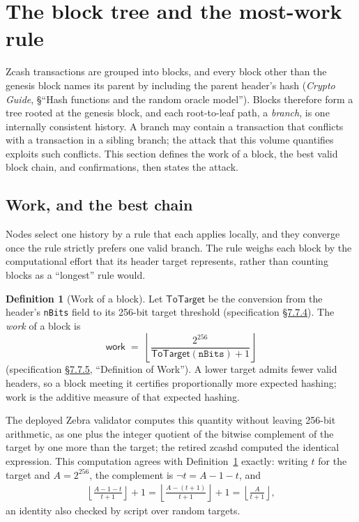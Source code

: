 \documentclass[11pt,a4paper]{article}
\theoremstyle{definition}
\newtheorem{definition}[theorem]{Definition}
\begin{document}
\section{The block tree and the most-work rule}\label{sec:cons-chain}

Zcash transactions are grouped into blocks, and every block other than the
genesis block names its parent by including the parent header's hash
(\emph{Crypto Guide}, \S``Hash functions and the random oracle model'').
Blocks therefore form a tree rooted at the genesis block, and each
root-to-leaf path, a \emph{branch}, is one internally consistent history. A
branch may contain a transaction that conflicts with a transaction in a
sibling branch; the attack that this volume quantifies exploits such
conflicts. This section defines the work of a block, the best valid block
chain, and confirmations, then states the attack.

\subsection{Work, and the best chain}\label{sec:cons-bestchain}

Nodes select one history by a rule that each applies locally, and they
converge once the rule strictly prefers one valid branch. The rule
weighs each block by the computational effort that its header target
represents, rather than counting blocks as a ``longest'' rule would.

\begin{definition}[Work of a block]\label{def:cons-work}
Let $\mathsf{ToTarget}$ be the conversion from the header's
\texttt{nBits} field to its 256-bit target threshold (specification
\href{https://zips.z.cash/protocol/protocol.pdf\#nbits}{\S7.7.4}). The \emph{work} of a block is
\[
  \mathsf{work} \;=\;
  \left\lfloor \frac{2^{256}}{\mathsf{ToTarget}(\texttt{nBits}) + 1}
  \right\rfloor
\]
(specification \href{https://zips.z.cash/protocol/protocol.pdf\#workdef}{\S7.7.5}, ``Definition of Work''). A lower target admits
fewer valid headers, so a block meeting it certifies proportionally more
expected hashing; work is the additive measure of that expected hashing.
\end{definition}

The deployed Zebra validator computes this quantity without leaving 256-bit
arithmetic, as one plus the integer quotient of the bitwise complement of the
target by one more than the target; the retired \textsf{zcashd} computed the
identical expression. This computation agrees with
Definition~\ref{def:cons-work} exactly: writing $t$ for the target and $A =
2^{256}$, the complement is $\lnot t = A - 1 - t$, and
\begin{gather*}
\left\lfloor \frac{A-1-t}{t+1} \right\rfloor + 1
= \left\lfloor \frac{A - (t+1)}{t+1} \right\rfloor + 1
= \left\lfloor \frac{A}{t+1} \right\rfloor,
\end{gather*}
an identity also checked by script over random targets.
\end{document}
